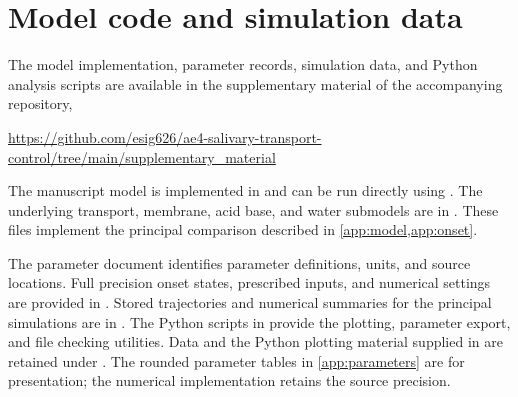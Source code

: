 \section{Model code and simulation data}
\label{app:code}

The model implementation, parameter records, simulation data, and Python analysis scripts are available in the supplementary material of the accompanying repository,
\begin{center}
\url{https://github.com/esig626/ae4-salivary-transport-control/tree/main/supplementary_material}
\end{center}
The manuscript model is implemented in  and can be run directly using . The underlying transport, membrane, acid base, and water submodels are in . These files implement the principal comparison described in \cref{app:model,app:onset}.

The parameter document  identifies parameter definitions, units, and source locations. Full precision onset states, prescribed inputs, and numerical settings are provided in . Stored trajectories and numerical summaries for the principal simulations are in . The Python scripts in  provide the plotting, parameter export, and file checking utilities. Data and the Python plotting material supplied in  are retained under . The rounded parameter tables in \cref{app:parameters} are for presentation; the numerical implementation retains the source precision.
